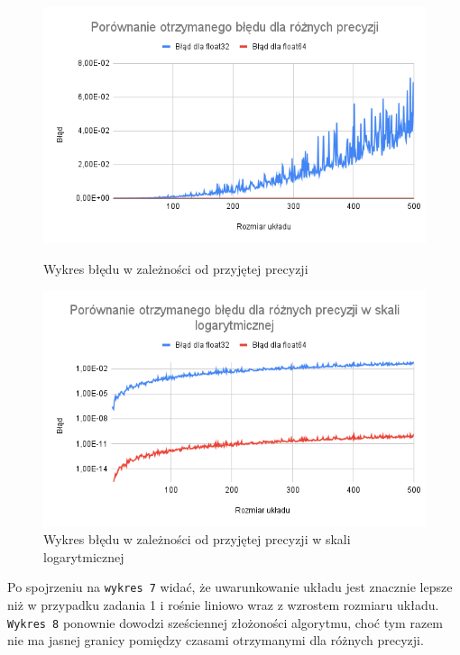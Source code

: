 \documentclass{article}
\begin{document}
\begin{figure}[H]
  \begin{minipage}[b]{0.49\textwidth}
    \includegraphics[width=\textwidth]{img05.png}
    \caption{Wykres błędu w zależności od przyjętej precyzji}
  \end{minipage}
  \hfill
  \begin{minipage}[b]{0.49\textwidth}
    \includegraphics[width=\textwidth]{img06.png}
    \caption{Wykres błędu w zależności od przyjętej precyzji w skali logarytmicznej }
  \end{minipage}
\end{figure}

\noindent
Po spojrzeniu na \texttt{wykres 7} widać, że uwarunkowanie układu jest znacznie lepsze niż w przypadku zadania 1 i rośnie liniowo wraz z wzrostem rozmiaru układu. \texttt{Wykres 8} ponownie dowodzi sześciennej złożoności algorytmu, choć tym razem nie ma jasnej granicy pomiędzy czasami otrzymanymi dla różnych precyzji.
\end{document}
